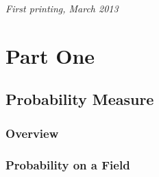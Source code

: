 \documentclass[11pt,fleqn]{book} %
\begin{document}
\noindent \textit{First printing, March 2013} %



\pagestyle{empty} %

\tableofcontents %

\cleardoublepage %

\pagestyle{fancy} %


\part{Part One}



\chapter{Probability Measure}



\section{Overview}







\section{Probability on a Field}
\end{document}
